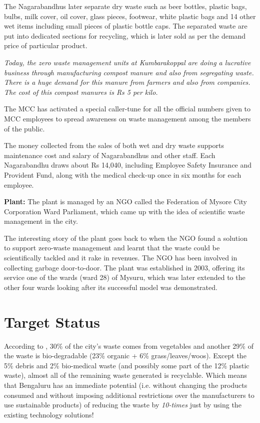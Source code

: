 \documentclass[10pt]{article}
\begin{document}
The Nagarabandhus later separate dry waste such as beer bottles, plastic bags, bulbs, milk cover, oil cover, glass pieces, footwear, white plastic bags and 14 other wet items including small pieces of plastic bottle caps. The separated waste are put into dedicated sections for recycling, which is later sold as per the demand price of particular product.

\textit{Today, the zero waste management units at Kumbarakoppal are doing a lucrative business through manufacturing compost manure and also from segregating waste.
There is a huge demand for this manure from farmers and also from companies. The cost of this compost manures is Rs 5 per kilo.}

The MCC has activated a special caller-tune for all the official numbers given to MCC employees to spread awareness on waste management among the members of the public.

The money collected from the sales of both wet and dry waste supports maintenance cost and salary of Nagarabandhus and other staff. Each Nagarabandhu draws about Rs 14,040, including Employee Safety Insurance and Provident Fund, along with the medical check-up once in six months for each employee.

\textbf{Plant:} The plant is managed by an NGO called the Federation of Mysore City Corporation Ward Parliament, which came up with the idea of scientific waste management in the city.

The interesting story of the plant goes back to when the NGO found a solution to support zero-waste management and learnt that the waste could be scientifically tackled and it rake in revenues. The NGO has been involved in collecting garbage door-to-door. The plant was established in 2003, offering its service one of the wards (ward 28) of Mysuru, which was later extended to the other four wards looking after its successful model was demonstrated.


\section{Target Status}

According to \cite{BBMP:cityStatistics}, 30\% of the city's waste comes from vegetables and another 29\% of the waste is bio-degradable (23\% organic + 6\% grass/leaves/woos). Except the 5\% debris and 2\% bio-medical waste (and possibly some part of the 12\% plastic waste), almost all of the remaining waste generated is recyclable. Which means that Bengaluru has an immediate potential (i.e. without changing the products consumed and without imposing additional restrictions over the manufacturers to use sustainable products) of reducing the waste by \emph{10-times} just by using the existing technology solutions!
\end{document}
